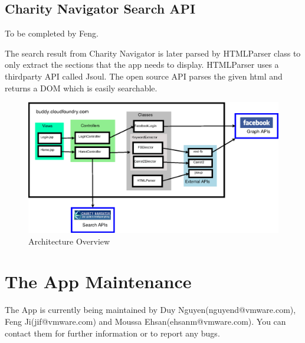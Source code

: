 \documentclass{article}
\begin{document}
\subsection{Charity Navigator Search API}
To be completed by Feng.

The search result from Charity Navigator is later parsed by HTMLParser class to only extract the sections that the app needs to display. HTMLParser uses a thirdparty API called Jsoul. The open source API parses the given html and returns a DOM which is easily searchable. 

\begin{figure}
\centering
\includegraphics[width=6.5in]{./figures/arch-diagram.eps}
\caption{Architecture Overview}\label{fig:arch}
\end{figure}


\section{The App Maintenance}
The App is currently being maintained by Duy Nguyen(nguyend@vmware.com), Feng Ji(jif@vmware.com) and Moussa Ehsan(ehsanm@vmware.com). You can contact them for further information or to report any bugs.

%
%
\end{document}
